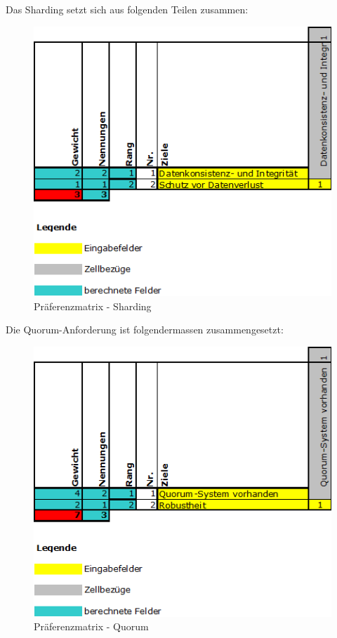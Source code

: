 \begin{flushleft}
    Das Sharding setzt sich aus folgenden Teilen zusammen:
    \begin{figure}[H]
        \centering
        \includegraphics[width=1\linewidth]{source/implementation/evaluation/requirements/preference_matrix_sharding}
        \caption{Präferenzmatrix - Sharding}
        \label{fig:preference_matrix_sharding}
    \end{figure}
\end{flushleft}
\begin{flushleft}
    Die Quorum-Anforderung ist folgendermassen zusammengesetzt:
    \begin{figure}[H]
        \centering
        \includegraphics[width=1\linewidth]{source/implementation/evaluation/requirements/preference_matrix_quorum}
        \caption{Präferenzmatrix - Quorum}
        \label{fig:preference_matrix_quorum}
    \end{figure}
\end{flushleft}
